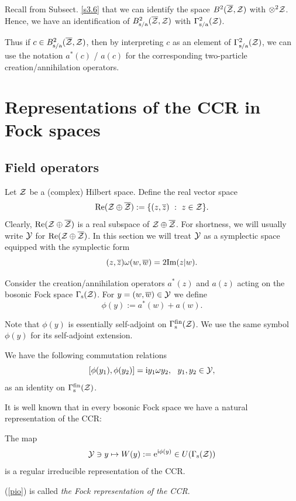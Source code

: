 \documentclass{svmult}
\newcommand{\beq}{\begin{equation}}
\newcommand{\eeq}{\end{equation}}
\def\bet{\begin{theorem}}
\def\eet{\end{theorem}}
\def\Im{{\rm Im}}
\def\Re{{\rm Re}}
\def\bar{\overline}
\def\s{{\rm s}}
\def\sa{{\rm s/a}}
\def\cZ{{\cal Z}}
\def\cY{{\cal Y}}
\def\fin{{\rm fin}}
\def\i{{\rm i}}
\def\e{{\rm e}}
\def\e{{\rm e}}
\def\s{{\rm s}}
\begin{document}
Recall from Subsect. \ref{s3.6}
that we can identify the space $B^2(\bar\cZ,\cZ)$ with $\otimes^2\cZ$.
Hence, we have an identification of
 $B_\sa^2(\bar\cZ,\cZ)$  with $\Gamma_\sa^2(\cZ)$.


Thus if $c\in B_\sa^2(\bar\cZ,\cZ)$, then by interpreting $c$ as an element of
$\Gamma_\sa^2(\cZ)$, we can use 
the notation $a^*(c)$ /  $a(c)$ for
 the corresponding
two-particle creation/annihilation operators.





\section{Representations of the CCR in Fock spaces}






\subsection{Field operators}



Let $\cZ$ be  a (complex) Hilbert space. 
Define the real vector space
\beq\Re(\cZ\oplus\bar\cZ):=
\{(z,\bar z)\ :\ z\in\cZ\}.\label{split}\eeq
Clearly, $\Re(\cZ\oplus\bar\cZ)$ is a real subspace  of $\cZ\oplus\bar\cZ$.
For shortness, we will usually write $\cY$ for $\Re(\cZ\oplus\bar\cZ)$.
In this section we will treat $\cY$ as a symplectic space equipped
 with  the symplectic
form
\[(z,\bar z)\omega (w,\bar w)=2\Im(z|w).\]

Consider the creation/annihilation operators
$a^*(z)$ and $a(z)$ acting on the bosonic Fock space $\Gamma_\s(\cZ)$.
 For $y=(w,\bar w)\in\cY$ we define 
\[\phi(y):=a^*(w)+a(w).\]






Note that $\phi(y)$ is essentially self-adjoint on $\Gamma_\s^\fin(\cZ)$.
We use the same symbol $\phi(y)$ for its self-adjoint extension.

We have the following commutation relations
\[[\phi(y_1),\phi(y_2)]=\i y_1\omega y_2,\ \ y_1,y_2\in\cY,\]
as an identity on $\Gamma_\s^\fin(\cZ)$.


It is well known that in every bosonic Fock space we have a natural
representation of the CCR:
\bet
 The map \beq
\cY\ni y\mapsto W(y):=\e^{\i\phi(y)}\in U(\Gamma_\s(\cZ))\label{pio}
\eeq
is 
a regular irreducible
representation of the CCR.
\eet (\ref{pio})
 is called {\em the Fock representation of the CCR}. 
\end{document}
